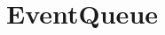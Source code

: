 \documentclass[11pt,fleqn]{book} %
\begin{document}
  \vspace{1em}

  \vspace{2em}

\section{EventQueue}
\end{document}
